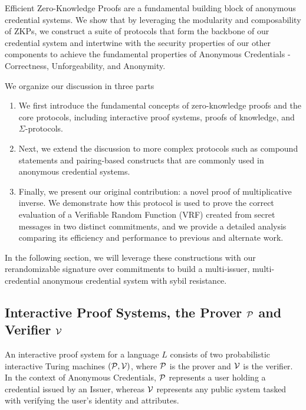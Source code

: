 Efficient Zero-Knowledge Proofs are a fundamental building block of anonymous credential systems. We show that by leveraging the modularity and composability of ZKPs, we construct a suite of protocols that form the backbone of our credential system and intertwine with the security properties of our other components to achieve the fundamental properties of Anonymous Credentials - Correctness, Unforgeability, and Anonymity.

We organize our discussion in three parts
\begin{enumerate}
    \item We first introduce the fundamental concepts of zero-knowledge proofs and the core protocols, including interactive proof systems, proofs of knowledge, and $\Sigma$-protocols.
    \item Next, we extend the discussion to more complex protocols such as compound statements and pairing-based constructs that are commonly used in anonymous credential systems.
    \item Finally, we present our original contribution: a novel proof of multiplicative inverse. We demonstrate how this protocol is used to prove the correct evaluation of a Verifiable Random Function (VRF) created from secret messages in two distinct commitments, and we provide a detailed analysis comparing its efficiency and performance to previous and alternate work.
\end{enumerate}
In the following section, we will leverage these constructions with our rerandomizable signature over commitments to build a multi-issuer, multi-credential anonymous credential system with sybil resistance.
















\subsection{Interactive Proof Systems, the Prover $\mathcal{P}$ and Verifier $\mathcal{V}$}

An interactive proof system for a language $L$ consists of two probabilistic interactive Turing machines $(\mathcal{P}, \mathcal{V})$, where $\mathcal{P}$ is the prover and $\mathcal{V}$ is the verifier. In the context of Anonymous Credentials, $\mathcal{P}$ represents a user holding a credential issued by an Issuer, whereas $\mathcal{V}$ represents any public system tasked with verifying the user's identity and attributes.

